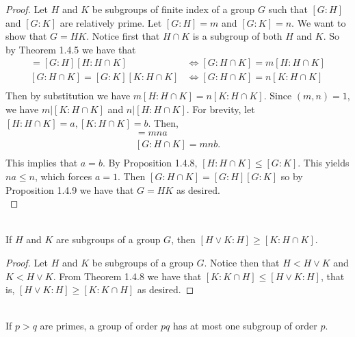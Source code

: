 \documentclass{article}
\begin{document}
\begin{proof}
    Let $H$ and $K$ be subgroups of finite index of a group $G$ such that $[G:H]$ and $[G:K]$ are relatively prime. Let $[G:H] = m$ and $[G:K] = n$. We want to show that $G = HK$. Notice first that $H \cap K$ is a subgroup of both $H$ and $K$. So by Theorem 1.4.5 we have that
    \begin{align*}
        [G: H \cap K] = [G : H][H : H \cap K] & \iff [G: H \cap K] = m[H : H \cap K] \\
        [G: H \cap K] = [G : K][K : H \cap K] & \iff [G: H \cap K] = n[K : H \cap K] \\
    \end{align*}
    Then by substitution we have $m[H : H \cap K] = n[K : H \cap K]$. Since $(m,n) = 1$, we have $m \vert [K : H \cap K]$ and $n | [H : H \cap K]$. For brevity, let $[H:H\cap K] = a, [K:H\cap K] = b$. Then,
    \begin{align*}
        [G : H \cap K] = mna \\
        [G : H \cap K] = mnb. \\
    \end{align*}
    This implies that $a = b$. By Proposition 1.4.8, $[H:H\cap K] \leq [G : K]$. This yields $na \leq n$, which forces $a = 1$. Then $[G: H \cap K] = [G : H][G : K]$ so by Proposition 1.4.9 we have that $G = HK$ as desired. \\
\end{proof}


\begin{problem}[Exercise 1.4.12] \\
    If $H$ and $K$ are subgroups of a group $G$, then $\left[ H \vee K : H\right] \geq \left[ K : H \cap K\right]$.
\end{problem}

\begin{proof}
    Let $H$ and $K$ be subgroups of a group $G$. Notice then that $ H < H \vee K$ and $K < H \vee K$. From Theorem 1.4.8 we have that $[K:K\cap H] \leq [H\vee K : H]$, that is, $[H\vee K : H] \geq [K:K\cap H]$ as desired.
\end{proof}



\begin{problem}[Exercise 1.4.13] \\
    If $p > q$ are primes, a group of order $pq$ has at most one subgroup of order $p$. \newline
    [\textit{Hint:} Suppose $H,K$ are distinct subgroups of order $p$. Show that $H \cap K = \langle e \rangle$; use Exercise 1.2.12 to get a contradiction.]
\end{problem}
\end{document}
